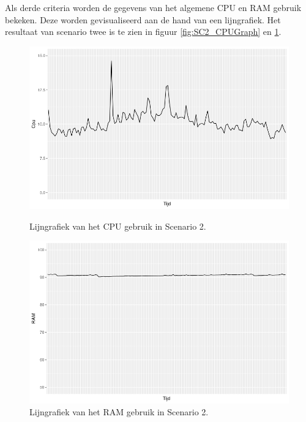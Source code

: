 Als derde criteria worden de gegevens van het algemene CPU en RAM gebruik bekeken. Deze worden gevisualiseerd aan de hand van een lijngrafiek. Het resultaat van scenario twee is te zien in figuur \ref{fig:SC2_CPUGraph} en \ref{fig:SC2_RAMGraph}. 
\begin{figure}[h]
	\centering
	\begin{minipage}[h]{0.45\linewidth}
		\includegraphics[width=\linewidth]{img/SC2_CPUGraph.png}
		\caption{Lijngrafiek van het CPU gebruik in Scenario 2.}
		\label{fig:SC2_CPUGraph}
	\end{minipage}
	\quad
	\begin{minipage}[h]{0.45\linewidth}
		\includegraphics[width=\linewidth]{img/SC2_RAMGraph.png}
		\caption{Lijngrafiek van het RAM gebruik in Scenario 2.}
		\label{fig:SC2_RAMGraph}
	\end{minipage}
\end{figure}

%



